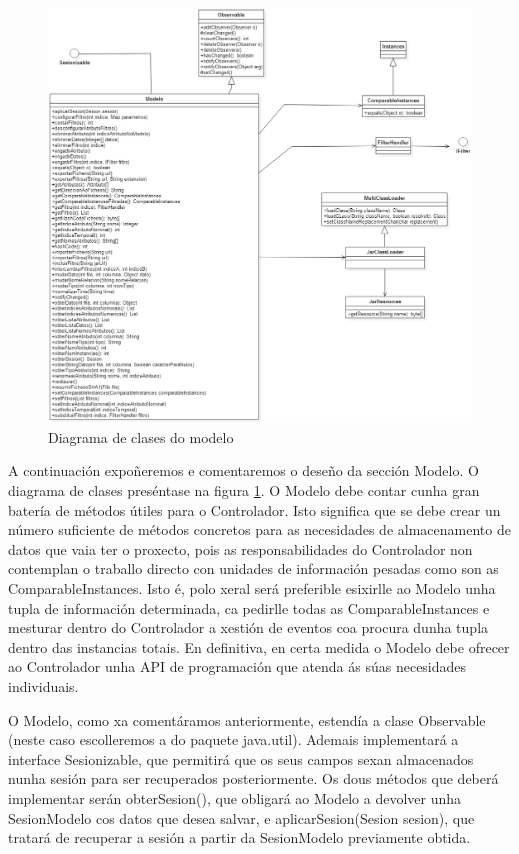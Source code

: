 \begin{figure}
\centering
\includegraphics[width=\textwidth,height=\textheight,keepaspectratio]{figuras/UMLModelo}
\caption{Diagrama de clases do modelo}
\label{UMLModelo}
\end{figure}

A continuación expoñeremos e comentaremos o deseño da sección Modelo. O diagrama de clases preséntase na figura \ref{UMLModelo}. O Modelo debe contar cunha gran batería de métodos útiles para o Controlador. Isto significa que se debe crear un número suficiente de métodos concretos para as necesidades de almacenamento de datos que vaia ter o proxecto, pois as responsabilidades do Controlador non contemplan o traballo directo con unidades de información pesadas como son as ComparableInstances. Isto é, polo xeral será preferible esixirlle ao Modelo unha tupla de información determinada, ca pedirlle todas as ComparableInstances e mesturar dentro do Controlador a xestión de eventos coa procura dunha tupla dentro das instancias totais. En definitiva, en certa medida o Modelo debe ofrecer ao Controlador unha API de programación que atenda ás súas necesidades individuais.

O Modelo, como xa comentáramos anteriormente, estendía a clase Observable (neste caso escolleremos a do paquete java.util). Ademais implementará a interface Sesionizable, que permitirá que os seus campos sexan almacenados nunha sesión para ser recuperados posteriormente. Os dous métodos que deberá implementar serán obterSesion(), que obligará ao Modelo a devolver unha SesionModelo cos datos que desea salvar, e aplicarSesion(Sesion sesion), que tratará de recuperar a sesión a partir da SesionModelo previamente obtida.

